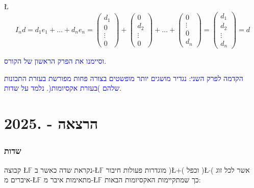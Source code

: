 \documentclass[english,hebrew]{article}
\begin{document}
\L{%
\[
I_{n}d=d_{1}e_{1}+\dots+d_{n}e_{n}=\begin{pmatrix}d_{1}\\
0\\
\vdots\\
0
\end{pmatrix}+\begin{pmatrix}0\\
d_{2}\\
\vdots\\
0
\end{pmatrix}+\dots+\begin{pmatrix}0\\
\vdots\\
0\\
d_{n}
\end{pmatrix}=\begin{pmatrix}d_{1}\\
d_{2}\\
\vdots\\
d_{n}
\end{pmatrix}=d
\]
}%

\bigskip{}

\textcolor{blue}{וסיימנו את הפרק הראשון של הקורס.}

\textcolor{blue}{הקדמה לפרק השני: נגדיר מושגים יותר מופשטים בצורה
פחות מפורשת בעזרת התכונות שלהם )בעזרת אקסיומות(. נלמד על שדות.}

\newpage{}

\noindent{}

\part{הרצאה {\endL} - {.2025\endL}}

\section{שדות}

קבוצה \L{$\mathbb{F}$} נקראת שדה כאשר ב-\L{$\mathbb{F}$} מוגדרות
פעולות חיבור )\L{$+$}( וכפל )\L{$\cdot$}( אשר לכל זוג איברים מ-\L{$\mathbb{F}$}
מתאימות איבר מ-\L{$\mathbb{F}$} כך שמתקיימות האקסיומות הבאות:\\
\end{document}
